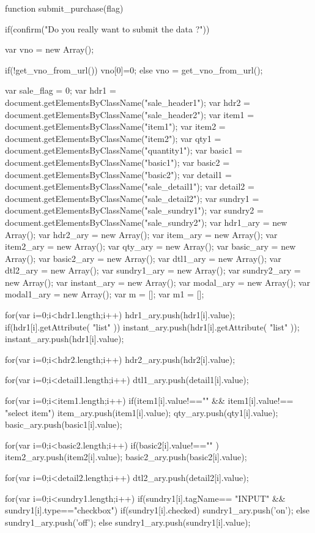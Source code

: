 function submit_purchase(flag){
	if(confirm("Do you really want to submit the data ?")){
		var vno = new Array();
		
		if(!get_vno_from_url()){
			vno[0]=0;
		}else{
			vno = get_vno_from_url();
		}
		
		var sale_flag = 0;
		var hdr1 = document.getElementsByClassName("sale_header1");
		var hdr2 = document.getElementsByClassName("sale_header2");
		var item1 = document.getElementsByClassName("item1");
		var item2 = document.getElementsByClassName("item2");
		var qty1 = document.getElementsByClassName("quantity1");
		var basic1 = document.getElementsByClassName("basic1");
		var basic2 = document.getElementsByClassName("basic2");
		var detail1 = document.getElementsByClassName("sale_detail1");
		var detail2 = document.getElementsByClassName("sale_detail2");
		var sundry1 =  document.getElementsByClassName("sale_sundry1"); 
		var sundry2 =  document.getElementsByClassName("sale_sundry2"); 
		var hdr1_ary = new Array();
		var hdr2_ary = new Array();
		var item_ary = new Array();
		var item2_ary = new Array();
		var qty_ary = new Array();
		var basic_ary = new Array();
		var basic2_ary = new Array();
		var dtl1_ary = new Array();
		var dtl2_ary = new Array();
		var sundry1_ary = new Array();
		var sundry2_ary = new Array();
		var instant_ary = new Array();
		var modal_ary = new Array();
		var modal1_ary = new Array();
		var m = [];
		var m1 = [];
		
		for(var i=0;i<hdr1.length;i++){
			hdr1_ary.push(hdr1[i].value);
			if(hdr1[i].getAttribute( "list" )){
				instant_ary.push(hdr1[i].getAttribute( "list" ));
				instant_ary.push(hdr1[i].value);
			}
		}
		
		for(var i=0;i<hdr2.length;i++){
			hdr2_ary.push(hdr2[i].value);
		}
		
		for(var i=0;i<detail1.length;i++){
			dtl1_ary.push(detail1[i].value);
		}
		
		for(var i=0;i<item1.length;i++){
			if(item1[i].value!=="" && item1[i].value!== "select item"){
				item_ary.push(item1[i].value);
				qty_ary.push(qty1[i].value);
				basic_ary.push(basic1[i].value);
			}
		}
		
		for(var i=0;i<basic2.length;i++){
			if(basic2[i].value!=="" ){
				item2_ary.push(item2[i].value);
				basic2_ary.push(basic2[i].value);
			}
		}
		
		for(var i=0;i<detail2.length;i++){
			dtl2_ary.push(detail2[i].value);
		}
		
		for(var i=0;i<sundry1.length;i++){
			if(sundry1[i].tagName== "INPUT" && sundry1[i].type=="checkbox"){
				if(sundry1[i].checked){
					sundry1_ary.push('on');
				}else{
					sundry1_ary.push('off');
				}
			}else{
				sundry1_ary.push(sundry1[i].value);
			}
		}
		
}}
